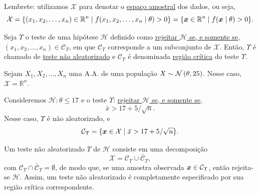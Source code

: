 \begin{note}
Lembrete: utilizamos $\mathcal{X}$ para denotar o \uline{espaço amostral} dos dados, ou seja,
\begin{equation}
\mathcal{X}=\{(x_1,x_2,\ldots,x_n)\in\mathbb{R}^n\mid f(x_1,x_2,\ldots,x_n\mid\theta)>0\}=\{\bm{x}\in\mathbb{R}^n\mid f(\bm{x}\mid\theta)>0\}.
\end{equation}
\end{note}

\begin{definition}
Seja $\Upsilon$ o teste de uma hipótese $\mathcal{H}$ definido como \uline{rejeitar $\mathcal{H}$ se, e somente se,} $(x_1,x_2,\ldots,x_n)\in\mathcal{C}_\Upsilon$, em que $\mathcal{C}_\Upsilon$ corresponde a um subconjunto de $\mathcal{X}$. Então, $\Upsilon$ é chamado de \uline{teste não aleatorizado} e $\mathcal{C}_\Upsilon$ é denominada \uline{região crítica} do teste $\Upsilon$.
\end{definition}

\begin{example}
Sejam $X_1,X_2,\ldots,X_n$ uma A.A. de uma população $X\sim\normdist{\theta,25}$. Nesse caso, $\mathcal{X}=\mathbb{R}^n$.

Consideremos $\mathcal{H}:\theta\leq17$ e o teste $\Upsilon$: \uline{rejeitar $\mathcal{H}$ se, e somente se,}
\begin{equation}
\bar{x}>17+5/\sqrt{n}.
\end{equation}
Nesse caso, $\Upsilon$ é não aleatorizado, e
\begin{equation}
\mathcal{C}_\Upsilon=\{\bm{x}\in\mathcal{X}\mid\,\overline{\!{x}}>17+5/\sqrt{n}\}.
\end{equation}
\end{example}

\begin{note}
Um teste não aleatorizado $\Upsilon$ de $\mathcal{H}$ consiste em uma decomposição
\begin{equation}
\mathcal{X}=\mathcal{C}_\Upsilon\cup\bar{\mathcal{C}}_\Upsilon,
\end{equation}
com $\mathcal{C}_\Upsilon\cap\bar{\mathcal{C}}_\Upsilon=\emptyset$, de modo que, se uma amostra observada $\bm{x}\in\mathcal{C}_\Upsilon$, então rejeita-se $\mathcal{H}$. Assim, um teste não aleatorizado é completamente especificado por sua região crítica correspondente.
\end{note}

